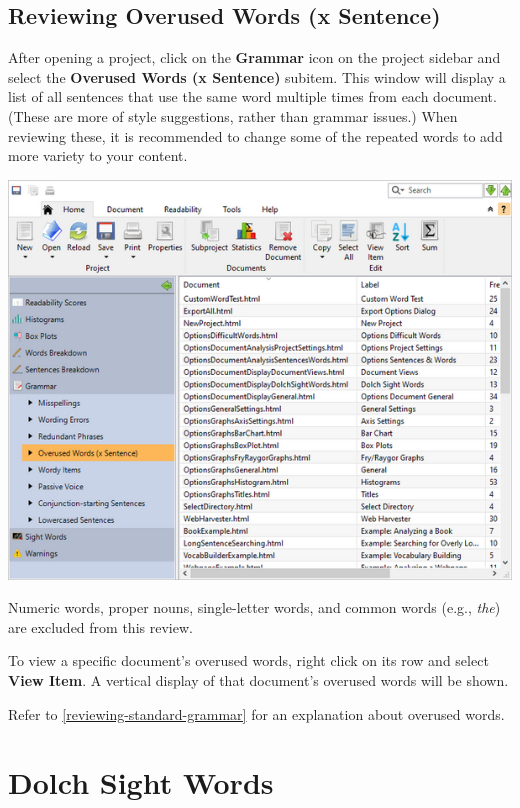 \documentclass[
]{book}
\theoremstyle{definition}
\theoremstyle{definition}
\theoremstyle{definition}
\theoremstyle{definition}
\theoremstyle{remark}
\begin{document}
\hypertarget{reviewing-batch-overused-words}{%
\subsection*{Reviewing Overused Words (x Sentence)}\label{reviewing-batch-overused-words}}

After opening a project, click on the \textbf{Grammar} icon on the project sidebar and select the \textbf{Overused Words (x Sentence)} subitem. This window will display a list of all sentences that use the same word multiple times from each document. (These are more of style suggestions, rather than grammar issues.) When reviewing these, it is recommended to change some of the repeated words to add more variety to your content.

\includegraphics{Images/batchoverusedwordsbysentence.png}

Numeric words, proper nouns, single-letter words, and common words (e.g., \emph{the}) are excluded from this review.

To view a specific document's overused words, right click on its row and select \textbf{View Item}. A vertical display of that document's overused words will be shown.

Refer to \ref{reviewing-standard-grammar} for an explanation about overused words.

\hypertarget{reviewing-batch-dolch}{%
\section{Dolch Sight Words}\label{reviewing-batch-dolch}}
\end{document}
